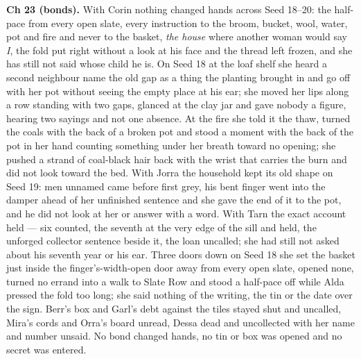 \documentclass{design/chronicle}
\begin{document}
{\textbf{Ch 23 (bonds).} With Corin nothing changed hands across Seed 18–20: the half-pace from every open slate, every instruction to the broom, bucket, wool, water, pot and fire and never to the basket, \emph{the house} where another woman would say \emph{I}, the fold put right without a look at his face and the thread left frozen, and she has still not said whose child he is. On Seed 18 at the loaf shelf she heard a second neighbour name the old gap as a thing the planting brought in and go off with her pot without seeing the empty place at his ear; she moved her lips along a row standing with two gaps, glanced at the clay jar and gave nobody a figure, hearing two sayings and not one absence. At the fire she told it the thaw, turned the coals with the back of a broken pot and stood a moment with the back of the pot in her hand counting something under her breath toward no opening; she pushed a strand of coal-black hair back with the wrist that carries the burn and did not look toward the bed. With Jorra the household kept its old shape on Seed 19: men unnamed came before first grey, his bent finger went into the damper ahead of her unfinished sentence and she gave the end of it to the pot, and he did not look at her or answer with a word. With Tarn the exact account held — six counted, the seventh at the very edge of the sill and held, the unforged collector sentence beside it, the loan uncalled; she had still not asked about his seventh year or his ear. Three doors down on Seed 18 she set the basket just inside the finger’s-width-open door away from every open slate, opened none, turned no errand into a walk to Slate Row and stood a half-pace off while Alda pressed the fold too long; she said nothing of the writing, the tin or the date over the sign. Berr’s box and Garl’s debt against the tiles stayed shut and uncalled, Mira’s cords and Orra’s board unread, Dessa dead and uncollected with her name and number unsaid. No bond changed hands, no tin or box was opened and no secret was entered.

}
\end{document}
